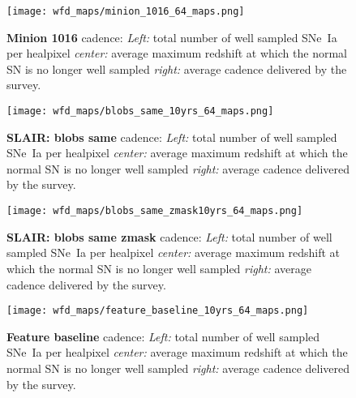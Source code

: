 \begin{figure}[h!]
  \begin{center}
    \texttt{[image: wfd\_maps/minion\_1016\_64\_maps.png]}
    \caption{{\bf Minion 1016} cadence: {\em Left:} total number of well
      sampled SNe~Ia per healpixel {\em center:} average maximum
      redshift at which the normal SN is no longer well sampled {\em
        right:} average cadence delivered by the survey.}
    \label{fig:minion_1016}
  \end{center}
\end{figure}

\begin{figure}[h!]
  \begin{center}
    \texttt{[image: wfd\_maps/blobs\_same\_10yrs\_64\_maps.png]}
    \caption{{\bf SLAIR: blobs same} cadence: {\em Left:} total number of well
      sampled SNe~Ia per healpixel {\em center:} average maximum
      redshift at which the normal SN is no longer well sampled {\em
        right:} average cadence delivered by the survey.}
    \label{fig:blobs_same}
  \end{center}
\end{figure}

\begin{figure}[h!]
  \begin{center}
    \texttt{[image: wfd\_maps/blobs\_same\_zmask10yrs\_64\_maps.png]}
    \caption{{\bf SLAIR: blobs same zmask} cadence: {\em Left:} total number of well
      sampled SNe~Ia per healpixel {\em center:} average maximum
      redshift at which the normal SN is no longer well sampled {\em
        right:} average cadence delivered by the survey.}
    \label{fig:blobs_same_zmask}
  \end{center}
\end{figure}

\begin{figure}[h!]
  \begin{center}
    \texttt{[image: wfd\_maps/feature\_baseline\_10yrs\_64\_maps.png]}
    \caption{{\bf Feature baseline} cadence: {\em Left:} total number of well
      sampled SNe~Ia per healpixel {\em center:} average maximum
      redshift at which the normal SN is no longer well sampled {\em
        right:} average cadence delivered by the survey.}
    \label{fig:feature_baseline}
  \end{center}
\end{figure}





